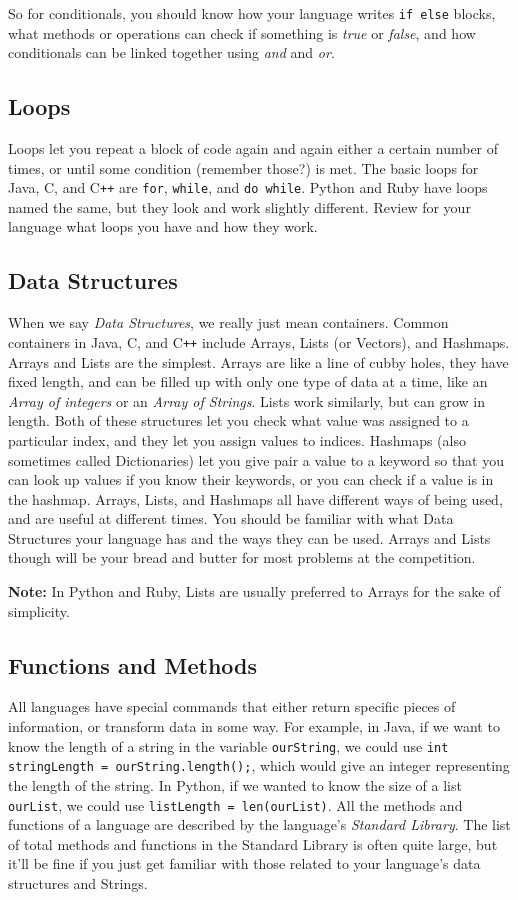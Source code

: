\documentclass[a4paper]{article}
\begin{document}
So for conditionals, you should know how your language writes \texttt{if else} blocks, what methods or operations can check if something is \textit{true} or \textit{false}, and how conditionals can be linked together using \textit{and} and \textit{or}.

\subsection{Loops}
Loops let you repeat a block of code again and again either a certain number of times, or until some condition (remember those?) is met. The basic loops for Java, C, and C\texttt{++} are \texttt{for}, \texttt{while}, and \texttt{do while}. Python and Ruby have loops named the same, but they look and work slightly different. Review for your language what loops you have and how they work.

\subsection{Data Structures}
When we say \textit{Data Structures}, we really just mean containers. Common containers in Java, C, and C\texttt{++} include Arrays, Lists (or Vectors), and Hashmaps. Arrays and Lists are the simplest. Arrays are like a line of cubby holes, they have fixed length, and can be filled up with only one type of data at a time, like an \textit{Array of integers} or an \textit{Array of Strings}. Lists work similarly, but can grow in length. Both of these structures let you check what value was assigned to a particular index, and they let you assign values to indices. Hashmaps (also sometimes called Dictionaries) let you give pair a value to a keyword so that you can look up values if you know their keywords, or you can check if a value is in the hashmap. Arrays, Lists, and Hashmaps all have different ways of being used, and are useful at different times. You should be familiar with what Data Structures your language has and the ways they can be used. Arrays and Lists though will be your bread and butter for most problems at the competition.

\textbf{Note:} In Python and Ruby, Lists are usually preferred to Arrays for the sake of simplicity. 

\subsection{Functions and Methods}
All languages have special commands that either return specific pieces of information, or transform data in some way. For example, in Java, if we want to know the length of a string in the variable \texttt{ourString}, we could use \texttt{int stringLength = ourString.length();}, which would give an integer representing the length of the string. In Python, if we wanted to know the size of a list \texttt{ourList}, we could use \texttt{listLength = len(ourList)}. All the methods and functions of a language are described by the language's \textit{Standard Library}. The list of total methods and functions in the Standard Library is often quite large, but it'll be fine if you just get familiar with those related to your language's data structures and Strings. 
\end{document}
